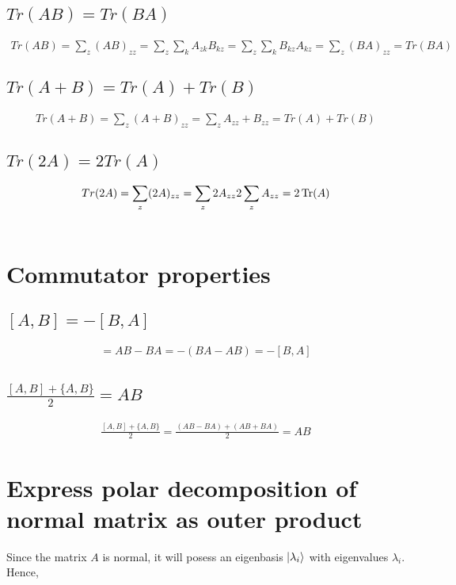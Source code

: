 \documentclass[11pt]{book}
\begin{document}
\subsection{$Tr(AB) = Tr(BA)$}
\begin{align*}
    Tr(AB) = \sum_z (AB)_{zz} = \sum_z \sum_k A_{zk} B_{kz} = \sum_z \sum_k B_{kz} A_{kz} = \sum_z (BA)_{zz} = Tr(BA)
\end{align*}

\subsection{$Tr(A + B) = Tr(A) + Tr(B)$}
\begin{align*}
    Tr(A + B) = \sum_z (A + B)_{zz} = \sum_z A_{zz} + B_{zz} = Tr(A) + Tr(B)
\end{align*}


\subsection{$Tr(2A) = 2Tr(A)$}
\begin{align*}
    Tr(2A) = \sum_z (2A)_{zz} = \sum_z 2 A_{zz} 2 \sum_z A_{zz} = 2 \Tr(A)
\end{align*}

\begin{align*}
\end{align*}

\section{Commutator properties}
\subsection{$[A, B] = -[B, A]$}
\begin{align*}
    [A, B] = AB - BA = - (BA - AB) = - [B, A]
\end{align*}

\subsection{$\frac{[A, B] + \{A, B\}}{2} = AB$}
\begin{align*}
    \frac{[A, B] + \{A, B\}}{2} = \frac{(AB - BA) + (AB + BA)}{2} = AB
\end{align*}

\section{Express polar decomposition of normal matrix as outer product}
Since the matrix $A$ is normal, it will posess an eigenbasis $\ket{\lambda_i}$
with eigenvalues $\lambda_i$. Hence,
\end{document}
